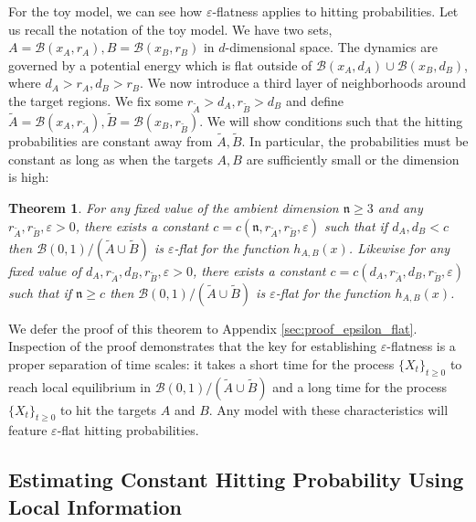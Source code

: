 \documentclass[english, aip, jcp, priprint, graphicx,floatfix]{revtex4-1}
\newtheorem{theorem}{Theorem}
\theoremstyle{plain}
\theoremstyle{definition}
\theoremstyle{plain}
\newcommand{\dimension}{{\mathfrak{n}}}
\newcommand{\bb}[1]{\mathcal{B}\left(#1\right)}
\begin{document}
For the toy model, we can see how  $\varepsilon$-flatness applies to hitting probabilities.  Let us recall the notation of the toy model.  We have two sets, $A=\bb{x_A,r_A},B=\bb{x_B,r_B}$ in $d$-dimensional space.  The dynamics are governed by a potential energy which is flat outside of $\bb{x_A,d_A}\cup\bb{x_B,d_B}$, where $d_A>r_A,d_B>r_B$.  We now introduce a third layer of neighborhoods around the target regions.  We fix some $r_{\tilde A}>d_A,r_{\tilde B}>d_B$ and define $\tilde A=\bb{x_A,r_{\tilde A}},\tilde B=\bb{x_B,r_{\tilde B}}$.  We will show conditions such that the hitting probabilities are constant away from $\tilde A,\tilde B$.  In particular, the probabilities must be constant as long as when the targets $A, B$ are sufficiently small or the dimension is high:

\begin{theorem}\label{thm:epsilon_flat}  For any fixed value of the ambient dimension $\dimension \geq 3$ and any $r_{\tilde{A}}, r_{\tilde{B}}, \varepsilon > 0$, there exists a constant $c=c(\dimension, r_{\tilde{A}}, r_{\tilde{B}}, \varepsilon)$ such that if $d_{A}, d_{B} < c$ then $\bb {0, 1} / (\tilde{A} \cup \tilde{B})$ is $\varepsilon$-flat for the function $h_{A,B}(x)$.  Likewise for any fixed value of $d_{A}, r_{\tilde{A}}, d_{B}, r_{\tilde{B}}, \varepsilon>0$, there exists a constant $c=c(d_{A}, r_{\tilde{A}}, d_{B}, r_{\tilde{B}}, \varepsilon)$ such that if $\dimension \geq c$ then $\bb {0, 1} / (\tilde{A} \cup \tilde{B})$ is $\varepsilon$-flat for the function $h_{A,B}(x)$.
\end{theorem}

We defer the proof of this theorem to Appendix \ref{sec:proof_epsilon_flat}. Inspection of the proof demonstrates that the key for establishing $\varepsilon$-flatness is a proper separation of time scales: it takes a short time for the process $\{X_t\}_{t\geq 0}$ to reach local equilibrium in $\bb {0, 1} / (\tilde{A} \cup \tilde{B})$ and a long time for the process $\{X_t\}_{t\geq 0}$ to hit the targets $A$ and $B$.  Any model with these characteristics will feature $\varepsilon$-flat hitting probabilities.

\subsection{Estimating Constant Hitting Probability Using Local Information}
\end{document}
